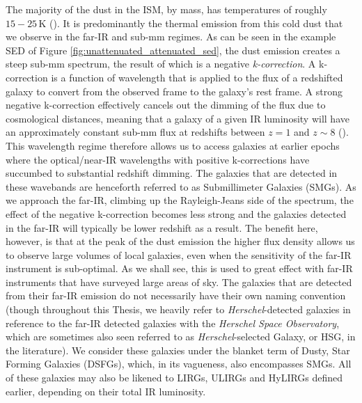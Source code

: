 The majority of the dust in the ISM, by mass, has temperatures of roughly $15 - 25\,$K (\citealt{daCunha_2008}). It is predominantly the thermal emission from this cold dust that we observe in the far-IR and sub-mm regimes. As can be seen in the example SED of Figure \ref{fig:unattenuated_attenuated_sed}, the dust emission creates a steep sub-mm spectrum, the result of which is a negative \textit{k-correction}. A k-correction is a function of wavelength that is applied to the flux of a redshifted galaxy to convert from the observed frame to the galaxy's rest frame. A strong negative k-correction effectively cancels out the dimming of the flux due to cosmological distances, meaning that a galaxy of a given IR luminosity will have an approximately constant sub-mm flux at redshifts between $z = 1$ and $z\sim8$ (\citealt{Casey_2014b}). This wavelength regime therefore allows us to access galaxies at earlier epochs where the optical/near-IR wavelengths with positive k-corrections have succumbed to substantial redshift dimming. The galaxies that are detected in these wavebands are henceforth referred to as Submillimeter Galaxies (SMGs). As we approach the far-IR, climbing up the Rayleigh-Jeans side of the spectrum, the effect of the negative k-correction becomes less strong and the galaxies detected in the far-IR will typically be lower redshift as a result. The benefit here, however, is that at the peak of the dust emission the higher flux density allows us to observe large volumes of local galaxies, even when the sensitivity of the far-IR instrument is sub-optimal. As we shall see, this is used to great effect with far-IR instruments that have surveyed large areas of sky. The galaxies that are detected from their far-IR emission do not necessarily have their own naming convention (though throughout this Thesis, we heavily refer to \textit{Herschel}-detected galaxies in reference to the far-IR detected galaxies with the \textit{Herschel Space Observatory}, which are sometimes also seen referred to as \textit{Herschel}-selected Galaxy, or HSG, in the literature). We consider these galaxies under the blanket term of Dusty, Star Forming Galaxies (DSFGs), which, in its vagueness, also encompasses SMGs. All of these galaxies may also be likened to LIRGs, ULIRGs and HyLIRGs defined earlier, depending on their total IR luminosity.

